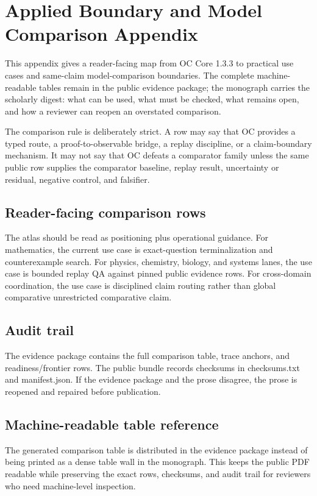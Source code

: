 \section{Applied Boundary and Model Comparison Appendix}

\label{sec:oc-core-1-3-practical-utility-atlas}

This appendix gives a reader-facing map from OC Core 1.3.3 to practical use cases and same-claim model-comparison boundaries. The complete machine-readable tables remain in the public evidence package; the monograph carries the scholarly digest: what can be used, what must be checked, what remains open, and how a reviewer can reopen an overstated comparison.


The comparison rule is deliberately strict. A row may say that OC provides a typed route, a proof-to-observable bridge, a replay discipline, or a claim-boundary mechanism. It may not say that OC defeats a comparator family unless the same public row supplies the comparator baseline, replay result, uncertainty or residual, negative control, and falsifier.


\subsection{Reader-facing comparison rows}

The atlas should be read as positioning plus operational guidance. For mathematics, the current use case is exact-question terminalization and counterexample search. For physics, chemistry, biology, and systems lanes, the use case is bounded replay QA against pinned public evidence rows. For cross-domain coordination, the use case is disciplined claim routing rather than global comparative unrestricted comparative claim.


\subsection{Audit trail}

The evidence package contains the full comparison table, trace anchors, and readiness/frontier rows. The public bundle records checksums in checksums.txt and manifest.json. If the evidence package and the prose disagree, the prose is reopened and repaired before publication.


\subsection{Machine-readable table reference}

The generated comparison table is distributed in the evidence package instead of being printed as a dense table wall in the monograph. This keeps the public PDF readable while preserving the exact rows, checksums, and audit trail for reviewers who need machine-level inspection.
